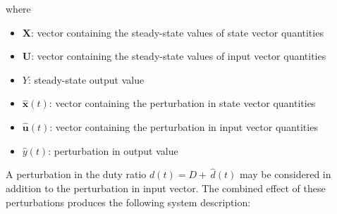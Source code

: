 where
\begin{itemize}
\item $\boldsymbol{X}$: vector containing the steady-state values of state vector quantities
\item $\boldsymbol{U}$: vector containing the steady-state values of input vector quantities
\item $Y$: steady-state output value
\item $\hat{\boldsymbol{x}}(t)$: vector containing the perturbation in state vector quantities
\item $\hat{\boldsymbol{u}}(t)$: vector containing the perturbation in input vector quantities
\item $\hat{y}(t)$: perturbation in output value
\end{itemize}
\iffalse
Separating the steady-state part from the time-varying part yields:
\begin{align*}
\boldsymbol{A} \boldsymbol{X} + \boldsymbol{b} \boldsymbol{U} &= 0
\\[11pt]
Y &= \boldsymbol{c} \boldsymbol{X}
\end{align*}
and
\begin{align*}
\dot{\hat{\boldsymbol{x}}}(t) &= \boldsymbol{A} \hat{\boldsymbol{x}}(t) + \boldsymbol{b} \hat{\boldsymbol{u}}(t)
\\[11pt]
\hat{y}(t) &= \boldsymbol{c} \hat{\boldsymbol{x}}(t)
\end{align*}
and the following relationship between steady-state quantities:
\begin{align*}
\boldsymbol{X} &= \minus \boldsymbol{A}^{-1} \boldsymbol{b} \boldsymbol{U}
\\[11pt]
Y &= \minus \boldsymbol{c} \boldsymbol{A}^{-1} \boldsymbol{b} \boldsymbol{U}
\end{align*}
\fi
A perturbation in the duty ratio $d(t) = D + \, \hat{d}(t)$ may be considered in addition to the perturbation in input vector. The combined effect of these perturbations produces the following system description:
\begingroup
\allowdisplaybreaks
